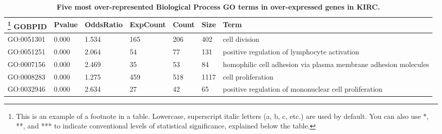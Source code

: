 \documentclass[9pt,twocolumn,twoside]{gsajnl}
\begin{document}
\newcolumntype{b}{X}
\begin{table}[htbp]
\centering
\caption{\bf Five most over-represented Biological Process GO terms in over-expressed genes in KIRC. }
\begin{tableminipage}{\textwidth}
\begin{tabularx}{\textwidth}{ssssssb}
\hline
\footnote{This is an example of a footnote in a table. Lowercase, superscript italic letters (a, b, c, etc.) are used by default. You can also use *, **, and *** to indicate conventional levels of statistical significance, explained below the table.}
GOBPID & Pvalue & OddsRatio & ExpCount & Count & Size & Term\\
\hline
GO:0051301 & 0.000 & 1.534 & 165 & 206 & 402 & cell division\\
GO:0051251 & 0.000 & 2.064 & 54 & 77 & 131 & positive regulation of lymphocyte activation\\
GO:0007156 & 0.000 & 2.469 & 35 & 53 & 84 & homophilic cell adhesion via plasma membrane adhesion molecules\\
GO:0008283 & 0.000 & 1.275 & 459 & 518 & 1117 & cell proliferation\\
GO:0032946 & 0.000 & 2.634 & 27 & 42 & 65 & positive regulation of mononuclear cell proliferation\\
\hline
\end{tabularx}
\end{tableminipage}
\end{table}



\end{document}
